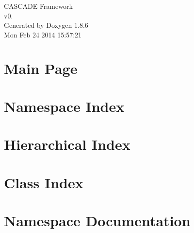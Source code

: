 \documentclass[twoside]{book}
\newcommand{\clearemptydoublepage}{%
  \newpage{\pagestyle{empty}\cleardoublepage}%
}
\begin{document}
\hypersetup{pageanchor=false}
\begin{titlepage}
\vspace*{7cm}
\begin{center}%
{\Large C\-A\-S\-C\-A\-D\-E Framework \\[1ex]\large v0. }\\
\vspace*{1cm}
{\large Generated by Doxygen 1.8.6}\\
\vspace*{0.5cm}
{\small Mon Feb 24 2014 15:57:21}\\
\end{center}
\end{titlepage}
\clearemptydoublepage
\tableofcontents
\clearemptydoublepage
{}
\hypersetup{pageanchor=true}

\chapter{Main Page}
\label{index}\hypertarget{index}{}
\chapter{Namespace Index}

\chapter{Hierarchical Index}

\chapter{Class Index}

\chapter{Namespace Documentation}




















\end{document}
